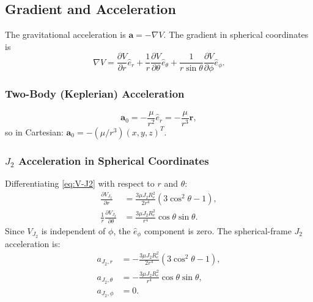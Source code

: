 \documentclass[11pt]{article}
\begin{document}
\subsection{Gradient and Acceleration}
\label{ssec:gradient}

The gravitational acceleration is $\mathbf{a} = -\nabla V$.  The gradient in
spherical coordinates is
\begin{equation}
  \nabla V
  = \frac{\partial V}{\partial r}\hat{e}_r
  + \frac{1}{r}\frac{\partial V}{\partial \theta}\hat{e}_\theta
  + \frac{1}{r\sin\theta}\frac{\partial V}{\partial \phi}\hat{e}_\phi.
  \label{eq:grad-sph}
\end{equation}

\subsubsection{Two-Body (Keplerian) Acceleration}

\begin{equation}
  \mathbf{a}_0 = -\frac{\mu}{r^2}\hat{e}_r
  = -\frac{\mu}{r^3}\mathbf{r},
  \label{eq:a0}
\end{equation}
so in Cartesian: $\mathbf{a}_0 = -(\mu/r^3)(x,y,z)^T$.

\subsubsection{$J_2$ Acceleration in Spherical Coordinates}

Differentiating \eqref{eq:V-J2} with respect to $r$ and $\theta$:
\begin{align}
  \frac{\partial V_{J_2}}{\partial r}
  &= \frac{3\mu J_2 R_e^2}{2r^4}(3\cos^2\theta-1),
  \label{eq:dVJ2dr}\\
  \frac{1}{r}\frac{\partial V_{J_2}}{\partial\theta}
  &= \frac{3\mu J_2 R_e^2}{r^4}\cos\theta\sin\theta.
  \label{eq:dVJ2dtheta}
\end{align}
Since $V_{J_2}$ is independent of $\phi$, the $\hat{e}_\phi$ component is zero.
The spherical-frame $J_2$ acceleration is:
\begin{align}
  a_{J_2,r}      &= -\frac{3\mu J_2 R_e^2}{2r^4}(3\cos^2\theta-1),
  \label{eq:aJ2r}\\
  a_{J_2,\theta} &= -\frac{3\mu J_2 R_e^2}{r^4}\cos\theta\sin\theta,
  \label{eq:aJ2theta}\\
  a_{J_2,\phi}   &= 0.
  \label{eq:aJ2phi}
\end{align}
\end{document}
